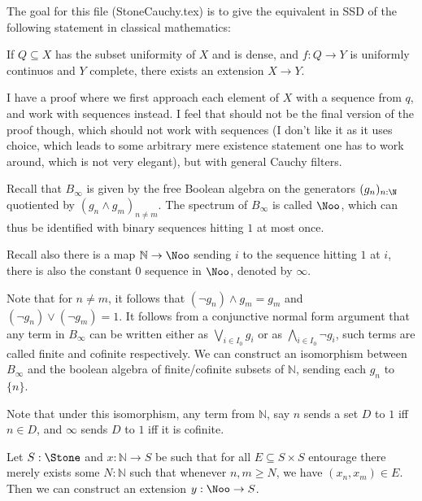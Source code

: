 The goal for this file (StoneCauchy.tex) is to give the equivalent in SSD of the following statement in classical mathematics: 
\begin{theorem}\label{GoalThmUniformCompleteExtension}
  If $Q\subseteq X$ has the subset uniformity of $X$ and is dense, and $f: Q \to Y$ is uniformly continuos and $Y$ complete, there exists an extension $X \to Y$. 
\end{theorem}
I have a proof where we first approach each element of $X$ with a sequence from $q$, and work with sequences instead. I feel that should not be the final version of the proof though, which should not work with sequences (I don't like it as it uses choice, which leads to some arbitrary mere existence statement one has to work around, which is not very elegant), but with general Cauchy filters. 

\begin{remark}\label{NooFacts}
  \item Recall that $B_\infty$ is given by the free Boolean algebra on the generators $(g_n)_{n:\N}$ quotiented by $(g_n \wedge g_m)_{n\neq m}$. The spectrum of $B_\infty$ is called $\Noo$, which can thus be identified with binary sequences hitting $1$ at most once. 
  \item Recall also there is a map $\mathbb N \to \Noo$ sending $i$ to the sequence hitting $1$ at $i$, there is also the constant $0$ sequence in $\Noo$, denoted by $\infty$. 
  \item Note that for $n\neq m$, it follows that $(\neg g_n) \wedge g_m = g_m$ and $(\neg g_n) \vee (\neg g_m) = 1$. It follows from a conjunctive normal form argument that any term in $B_\infty$ can be written either as $\bigvee_{i\in I_0} g_i$ or as $\bigwedge_{i\in I_0} \neg g_i$, such terms are called finite and cofinite respectively. We can construct an isomorphism between $B_\infty$ and the boolean algebra of finite/cofinite subsets of $\mathbb N$, sending each $g_n$ to $\{n\}$. 
  \item Note that under this isomorphism, any term from $\mathbb N$, say $n$ sends a set $D$ to $1$ iff $n\in D$, and $\infty$ sends $D$ to $1$ iff it is cofinite. 
\end{remark}


\begin{lemma}
  Let $S:\Stone$ and $x:\mathbb N \to S$ be such that %
  for all $E\subseteq S \times S$ entourage there merely exists some $N:\mathbb N$ such that whenever $n,m\geq N$, we have $(x_n,x_m) \in E$. Then we can construct an extension $y:\Noo \to S$. 
\end{lemma}



